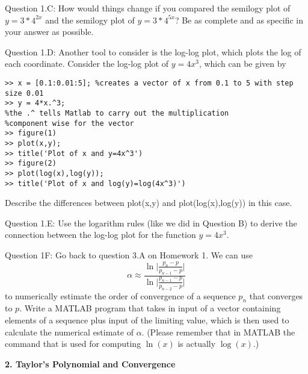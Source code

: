 \documentclass{article}
\def\ds{\displaystyle}
\begin{document}
\medskip \par \noindent
%
Question 1.C: How would things change if you compared the semilogy plot of $\ds y = 3*4^{2x}$ and the semilogy plot of $\ds y = 3*4^{5x}$? Be as complete and as specific in your answer as possible. \medskip \par \noindent
%
Question 1.D: Another tool to consider is the log-log plot, which plots the log of each coordinate. Consider the log-log plot of $\ds y = 4x^3$, which can be given by
\begin{verbatim}
>> x = [0.1:0.01:5]; %creates a vector of x from 0.1 to 5 with step size 0.01
>> y = 4*x.^3; 
%the .^ tells Matlab to carry out the multiplication 
%component wise for the vector
>> figure(1)
>> plot(x,y);
>> title('Plot of x and y=4x^3')
>> figure(2)
>> plot(log(x),log(y));
>> title('Plot of x and log(y)=log(4x^3)')    
\end{verbatim}
\par
Describe the differences between plot(x,y) and plot(log(x),log(y)) in this case. 
\medskip \par \noindent
%
Question 1.E: Use the logarithm rules (like we did in Question B) to derive the connection between the log-log plot for the function $\ds y=4x^3$.
\medskip \par \noindent
%
Question 1F: Go back to question 3.A on Homework 1. We can use 
$$\alpha \approx \frac {\ln \biggr \vert \frac {p_n-p}{p_{n-1}-p}\biggr \vert}{\ln \biggr \vert \frac {p_{n-1}-p}{p_{n-2}-p}\biggr \vert}$$
to numerically estimate the order of convergence of a sequence $\ds p_n$ that converges to $p$. Write a MATLAB program that takes in input of a vector containing elements of a sequence plus input of the limiting value, which is then used to calculate the numerical estimate of $\alpha$. (Please remember that in MATLAB the command that is used for computing $\ln(x)$ is actually $\log(x)$.)
\par \bigskip \par
{\bf 2. Taylor's Polynomial and Convergence} \\
\end{document}
